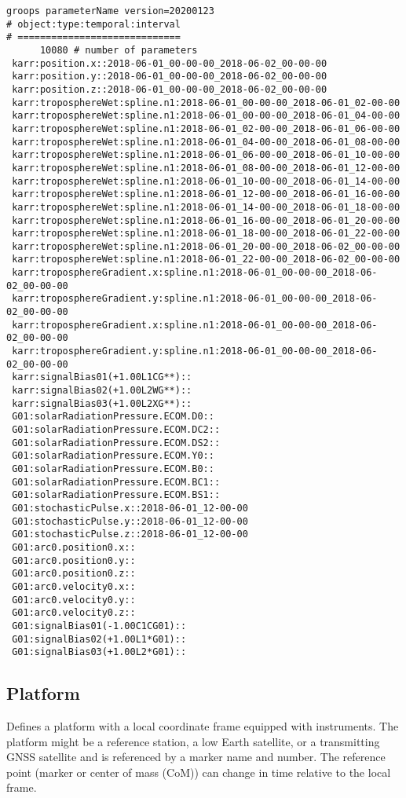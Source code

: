 \begin{verbatim}
groops parameterName version=20200123
# object:type:temporal:interval
# =============================
      10080 # number of parameters
 karr:position.x::2018-06-01_00-00-00_2018-06-02_00-00-00
 karr:position.y::2018-06-01_00-00-00_2018-06-02_00-00-00
 karr:position.z::2018-06-01_00-00-00_2018-06-02_00-00-00
 karr:troposphereWet:spline.n1:2018-06-01_00-00-00_2018-06-01_02-00-00
 karr:troposphereWet:spline.n1:2018-06-01_00-00-00_2018-06-01_04-00-00
 karr:troposphereWet:spline.n1:2018-06-01_02-00-00_2018-06-01_06-00-00
 karr:troposphereWet:spline.n1:2018-06-01_04-00-00_2018-06-01_08-00-00
 karr:troposphereWet:spline.n1:2018-06-01_06-00-00_2018-06-01_10-00-00
 karr:troposphereWet:spline.n1:2018-06-01_08-00-00_2018-06-01_12-00-00
 karr:troposphereWet:spline.n1:2018-06-01_10-00-00_2018-06-01_14-00-00
 karr:troposphereWet:spline.n1:2018-06-01_12-00-00_2018-06-01_16-00-00
 karr:troposphereWet:spline.n1:2018-06-01_14-00-00_2018-06-01_18-00-00
 karr:troposphereWet:spline.n1:2018-06-01_16-00-00_2018-06-01_20-00-00
 karr:troposphereWet:spline.n1:2018-06-01_18-00-00_2018-06-01_22-00-00
 karr:troposphereWet:spline.n1:2018-06-01_20-00-00_2018-06-02_00-00-00
 karr:troposphereWet:spline.n1:2018-06-01_22-00-00_2018-06-02_00-00-00
 karr:troposphereGradient.x:spline.n1:2018-06-01_00-00-00_2018-06-02_00-00-00
 karr:troposphereGradient.y:spline.n1:2018-06-01_00-00-00_2018-06-02_00-00-00
 karr:troposphereGradient.x:spline.n1:2018-06-01_00-00-00_2018-06-02_00-00-00
 karr:troposphereGradient.y:spline.n1:2018-06-01_00-00-00_2018-06-02_00-00-00
 karr:signalBias01(+1.00L1CG**)::
 karr:signalBias02(+1.00L2WG**)::
 karr:signalBias03(+1.00L2XG**)::
 G01:solarRadiationPressure.ECOM.D0::
 G01:solarRadiationPressure.ECOM.DC2::
 G01:solarRadiationPressure.ECOM.DS2::
 G01:solarRadiationPressure.ECOM.Y0::
 G01:solarRadiationPressure.ECOM.B0::
 G01:solarRadiationPressure.ECOM.BC1::
 G01:solarRadiationPressure.ECOM.BS1::
 G01:stochasticPulse.x::2018-06-01_12-00-00
 G01:stochasticPulse.y::2018-06-01_12-00-00
 G01:stochasticPulse.z::2018-06-01_12-00-00
 G01:arc0.position0.x::
 G01:arc0.position0.y::
 G01:arc0.position0.z::
 G01:arc0.velocity0.x::
 G01:arc0.velocity0.y::
 G01:arc0.velocity0.z::
 G01:signalBias01(-1.00C1CG01)::
 G01:signalBias02(+1.00L1*G01)::
 G01:signalBias03(+1.00L2*G01)::
\end{verbatim}


\subsection{Platform}\label{general.fileFormat:platform}
Defines a platform with a local coordinate frame equipped with instruments.
The platform might be a reference station, a low Earth satellite,
or a transmitting GNSS satellite and is referenced by a marker name and number.
The reference point (marker or center of mass (CoM)) can change in time
relative to the local frame.

